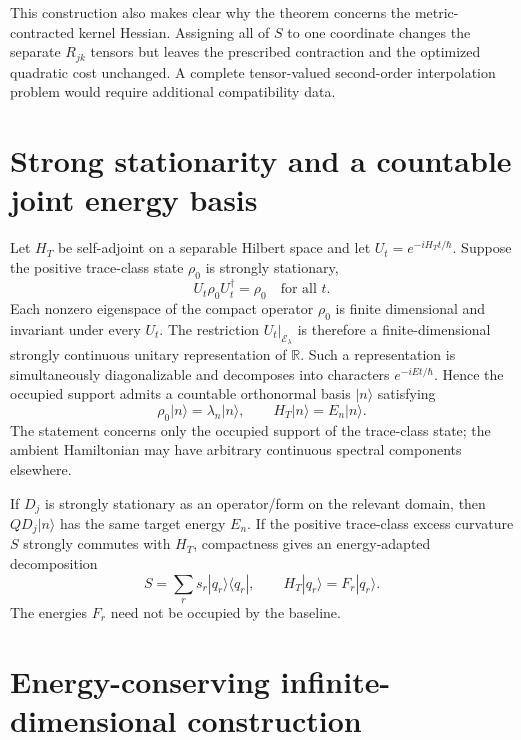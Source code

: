 \documentclass[aps,pra,preprint,nofootinbib]{revtex4-2}
\newcommand{\rhozero}{\rho_0}
\begin{document}
This construction also makes clear why the theorem concerns the metric-contracted kernel Hessian. Assigning all of $S$ to one coordinate changes the separate $R_{jk}$ tensors but leaves the prescribed contraction and the optimized quadratic cost unchanged. A complete tensor-valued second-order interpolation problem would require additional compatibility data.

\section{Strong stationarity and a countable joint energy basis}

Let $H_T$ be self-adjoint on a separable Hilbert space and let $U_t=e^{-iH_Tt/\hbar}$. Suppose the positive trace-class state $\rhozero$ is strongly stationary,
\begin{equation}
 U_t\rhozero U_t^\dagger=\rhozero\quad\text{for all }t.
\end{equation}
Each nonzero eigenspace of the compact operator $\rhozero$ is finite dimensional and invariant under every $U_t$. The restriction $U_t|_{\mathcal E_\lambda}$ is therefore a finite-dimensional strongly continuous unitary representation of $\mathbb R$. Such a representation is simultaneously diagonalizable and decomposes into characters $e^{-iEt/\hbar}$. Hence the occupied support admits a countable orthonormal basis $|n\rangle$ satisfying
\begin{equation}
 \rhozero|n\rangle=\lambda_n|n\rangle,
 \qquad
 H_T|n\rangle=E_n|n\rangle.
 \label{eq:sup-jointbasis}
\end{equation}
The statement concerns only the occupied support of the trace-class state; the ambient Hamiltonian may have arbitrary continuous spectral components elsewhere.

If $D_j$ is strongly stationary as an operator/form on the relevant domain, then $QD_j|n\rangle$ has the same target energy $E_n$. If the positive trace-class excess curvature $S$ strongly commutes with $H_T$, compactness gives an energy-adapted decomposition
\begin{equation}
 S=\sum_rs_r|q_r\rangle\langle q_r|,
 \qquad H_T|q_r\rangle=F_r|q_r\rangle.
 \label{eq:sup-Senergy}
\end{equation}
The energies $F_r$ need not be occupied by the baseline.

\section{Energy-conserving infinite-dimensional construction}
\end{document}
